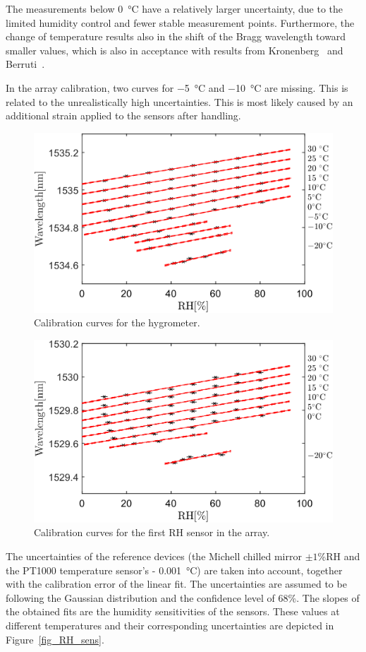 The measurements below \SI{0}{\celsius} have a relatively larger uncertainty, due to the limited humidity control and fewer stable measurement points. Furthermore, the change of temperature results also in the shift of the Bragg wavelength toward smaller values, which is also in acceptance with results from Kronenberg~\cite{Kronenberg:02} and Berruti~\cite{Berruti}.

In the array calibration, two curves for \SI{-5}{\celsius} and \SI{-10}{\celsius} are missing. This is related to the unrealistically high uncertainties. This is most likely caused by an additional strain applied to the sensors after handling. %

\begin{figure}[!h]
\centering
\includegraphics[width=0.7\columnwidth]{Chapter5/images/RHS.png}
\caption{Calibration curves for the hygrometer.}
\label{fig_single_calibration}
\end{figure}

\begin{figure}[!h]
\centering
\includegraphics[width=0.7\columnwidth]{Chapter5/images/RH1.png}
\caption{Calibration curves for the first \gls{RH} sensor in the array.}
\label{fig_array_calibration}
\end{figure}
\newpage
The uncertainties of the reference devices (the Michell chilled mirror $\pm 1$\%RH and the PT1000 temperature sensor's - \SI{0.001}{\celsius}) are taken into account, together with the calibration error of the linear fit. The uncertainties are assumed to be following the Gaussian distribution and the confidence level of 68\%. The slopes of the obtained fits are the humidity sensitivities of the sensors. These values at different temperatures and their corresponding uncertainties are depicted in Figure~\ref{fig_RH_sens}. 

